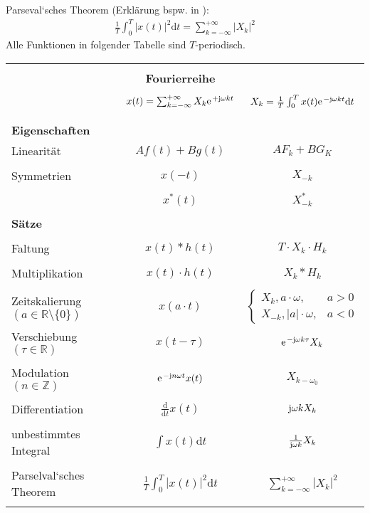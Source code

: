 \documentclass[11pt,a4paper,DIV=12]{scrartcl}
\begin{document}
Parseval`sches Theorem (Erklärung bspw. in \cite[Kap. 2, S. 27-28]{Meyer2017} ):
\begin{align}
	\frac{1}{T}\int_{0}^{T}\left|x(t)\right|^2\mathrm{d}t=\sum_{k=-\infty}^{+\infty}\left|X_k\right|^2
\end{align}
Alle Funktionen in folgender Tabelle sind $T$-periodisch.\\
\begin{tabular}{|lcc|}
	\hline
	&&\\
	&\textbf{Fourierreihe}& \\
	\hline
	&&\\
	& $x(t)=\sum_{k=-\infty}^{+\infty}X_k\e^{+\im\omega k t} $ & $X_k=\frac{1}{T}\int_0^Tx(t)\e^{-\im\omega k t}\mathrm{d}t $ \\&&\\
	\hline
	&&\\
	\textbf{Eigenschaften} & & \\
	Linearität & $Af(t)+Bg(t)$ & $AF_k+BG_K$\\&& \\
	Symmetrien & $x(-t)$ & $X_{-k}$ \\ &&\\
	& $x^*(t)$ & $X^*_{-k}$ \\ &&\\
	\hline
	\textbf{Sätze} & & \\&& \\
	Faltung & $x(t)\ast h(t)$ & $T\cdot X_k\cdot H_k$ \\&& \\
	Multiplikation & $x(t)\cdot h(t)$ & $X_k \ast H_k $ \\&& \\
	Zeitskalierung $(a\in\mathbb{R}\setminus\{0\})$& $x(a\cdot t)$ & $\begin{cases}
		X_k,a\cdot\omega, &a>0\\
		X_{-k},|a|\cdot\omega, &a<0
	\end{cases}$\\
	Verschiebung $(\tau \in \mathbb{R})$ & $x(t-\tau)$& $\e^{-\im\omega k \tau}X_k$\\&& \\
	Modulation $(n \in \mathbb{Z})$& $\e^{-\im n \omega t}x(t)$ & $X_{k-\omega_0}$ \\&& \\
	Differentiation & $\frac{\mathrm{d}}{\mathrm{d}t}x(t)$ & $\im\omega k X_k$\\&& \\
	unbestimmtes Integral &$\int x(t)\mathrm{d}t $ & $\frac{1}{\im\omega k}X_k$\\&& \\
	Parselval`sches Theorem & $\frac{1}{T}\int_0^T|x(t)|^2\mathrm{d}t$ & $\sum_{k=-\infty}^{+\infty}|X_k|^2$\\&& \\
	\hline
\end{tabular}







\renewcommand{\refname}{Buchzitate}
\clearpage

\end{document}
